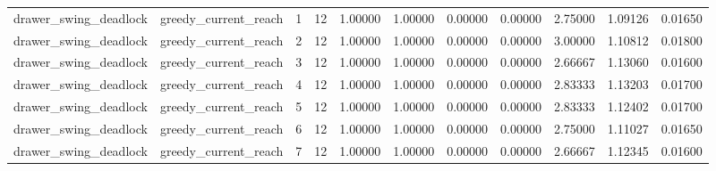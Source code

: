 \documentclass{article}
\begin{document}
\begin{table}[tbp]
{\begin{tabular}{lllllllllll}
drawer\_swing\_deadlock & greedy\_current\_reach & 1 & 12 & 1.00000 & 1.00000 & 0.00000 & 0.00000 & 2.75000 & 1.09126 & 0.01650 \\
drawer\_swing\_deadlock & greedy\_current\_reach & 2 & 12 & 1.00000 & 1.00000 & 0.00000 & 0.00000 & 3.00000 & 1.10812 & 0.01800 \\
drawer\_swing\_deadlock & greedy\_current\_reach & 3 & 12 & 1.00000 & 1.00000 & 0.00000 & 0.00000 & 2.66667 & 1.13060 & 0.01600 \\
drawer\_swing\_deadlock & greedy\_current\_reach & 4 & 12 & 1.00000 & 1.00000 & 0.00000 & 0.00000 & 2.83333 & 1.13203 & 0.01700 \\
drawer\_swing\_deadlock & greedy\_current\_reach & 5 & 12 & 1.00000 & 1.00000 & 0.00000 & 0.00000 & 2.83333 & 1.12402 & 0.01700 \\
drawer\_swing\_deadlock & greedy\_current\_reach & 6 & 12 & 1.00000 & 1.00000 & 0.00000 & 0.00000 & 2.75000 & 1.11027 & 0.01650 \\
drawer\_swing\_deadlock & greedy\_current\_reach & 7 & 12 & 1.00000 & 1.00000 & 0.00000 & 0.00000 & 2.66667 & 1.12345 & 0.01600 \\
\bottomrule
\end{tabular}
}
\end{table}

\clearpage
\end{document}
